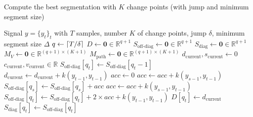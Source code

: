 \documentclass[12pt]{article}
\newcommand\RR{\mathbb{R}}
\DeclarePairedDelimiter\ceil{\lceil}{\rceil}
\begin{document}
\begin{algorithm}
    \scriptsize
    \caption{Compute the best segmentation with $K$ change points (with jump and minimum segment size)}
    \label{alg:dynp_jump_min_size} %
    \begin{algorithmic} %
        \REQUIRE Signal $y = \{y_t\}_t$ with $T$ samples, number $K$ of change points, jump $\delta$, minimum segment size $\Delta$
        \STATE {}
        \STATE $q\gets \ceil{T/\delta}$ 
        \STATE $D \gets \bm{0}\in\mathbb{R}^{q+1}$ 
        \STATE $S_{\text{off-diag}} \gets \bm{0}\in\mathbb{R}^{q+1}$ 
        \STATE $S_{\text{diag}} \gets \bm{0}\in\mathbb{R}^{q+1}$ 
        \STATE $M_V \gets \bm{0}\in\mathbb{R}^{(q+1)\times (K+1)}$ 
        \STATE $M_{\text{path}} \gets \bm{0}\in\mathbb{R}^{(q+1)\times (K+1)}$ 
        \STATE $d_{\text{current}},s_{\text{current}}\gets0$ 
        \STATE $c_{\text{current}}, v_{\text{current}}\in\RR$ 
        \STATE
        \STATE $S_{\text{off-diag}}[q_t]\gets S_{\text{off-diag}}[q_t-1]$
        \STATE $d_{\text{current}}\gets d_{\text{current}} + k(y_{t-1}, y_{t-1})$
        \STATE {}
        \STATE $acc\gets0$
        \STATE $acc \gets acc + k(y_{s-1}, y_{t-1})$
        \ENDFOR
        \STATE $S_{\text{off-diag}}[q_s] \gets S_{\text{off-diag}}[q_s] + acc$ 
        \ENDFOR
        \STATE $acc \gets acc + k(y_{s-1}, y_{t-1})$
        \ENDFOR
        \STATE $S_{\text{off-diag}}[q_t] \gets S_{\text{off-diag}}[q_t] + 2\times acc +  k(y_{t-1}, y_{t-1})$
        \ENDFOR
        \STATE $D[q_t] \gets d_{\text{current}}$ 
        \STATE $S_{\text{diag}}[q_t] \gets S_{\text{off-diag}}[q_t]$
        \STATE
        \STATE {}

\end{algorithmic}
\end{algorithm}
\end{document}
